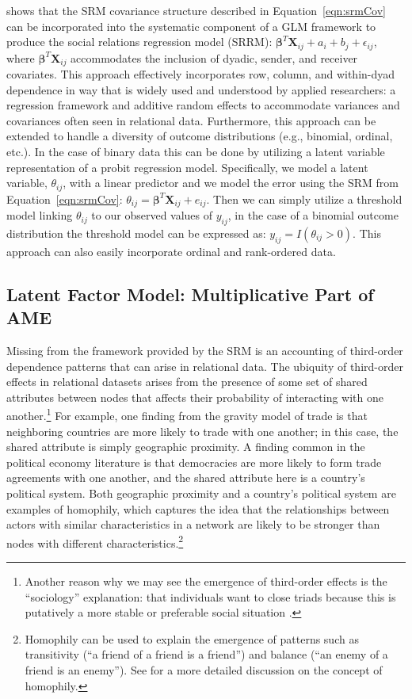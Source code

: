\documentclass[12pt,pdflatex]{elsarticle}
\begin{document}
\citet{hoff:2005} shows that the SRM covariance structure described in Equation~\ref{eqn:srmCov} can be incorporated into the systematic component of a GLM framework to produce the social relations regression model (SRRM): $\bm\beta^{T} \mathbf{X}_{ij} + a_{i} + b_{j} + \epsilon_{ij}$, where $ \bm\beta^{T} \mathbf{X}_{ij}$ accommodates the inclusion of dyadic, sender, and receiver covariates. This approach  effectively incorporates row, column, and within-dyad dependence in way that is widely used and understood by applied researchers: a regression framework and additive random effects to accommodate variances and covariances often seen in relational data. Furthermore, this approach can be extended to handle a diversity of outcome distributions (e.g., binomial, ordinal, etc.). In the case of binary data this can be done by utilizing a latent variable representation of a probit regression model. Specifically, we model a latent variable, $\theta_{ij}$, with a linear predictor and we model the error using the SRM from Equation~\ref{eqn:srmCov}: $\theta_{ij} = \bm\beta^{T} \mathbf{X}_{ij} + e_{ij}$. Then we can simply utilize a threshold model linking $\theta_{ij}$ to our observed values of $y_{ij}$, in the case of a binomial outcome distribution the threshold model can be expressed as: $y_{ij} = I(\theta_{ij}>0)$.  This approach can also easily incorporate ordinal and rank-ordered data.

\subsection{Latent Factor Model: Multiplicative Part of AME}

Missing from the framework provided by the SRM is an accounting of third-order dependence patterns that can arise in relational data. The ubiquity of third-order effects in relational datasets arises from the presence of some set of shared attributes between nodes that affects their probability of interacting with one another.\footnote{Another reason why we may see the emergence of third-order effects is the ``sociology'' explanation: that individuals want to close triads because  this is putatively a more stable or preferable social situation \citep{wasserman:faust:1994}.} For example, one finding from the gravity model of trade is that neighboring countries are more likely to trade with one another; in this case, the shared attribute is simply geographic proximity. A finding common in the political economy literature is that democracies are more likely to form trade agreements with one another, and the shared attribute here is a country's political system. Both geographic proximity and a country's political system are examples of homophily, which captures the idea that the relationships between actors with similar characteristics in a network are likely to be stronger than nodes with different characteristics.\footnote{Homophily can be used to explain the emergence of patterns such as transitivity (``a friend of a friend is a friend'') and balance (``an enemy of a friend is an enemy''). See \citet{shalizi:thomas:2011} for a more detailed discussion on the concept of homophily.} 
\end{document}
